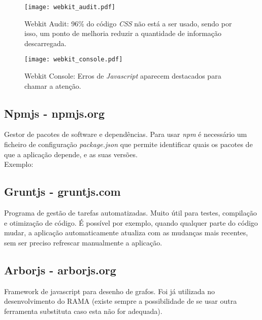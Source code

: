     \begin{figure}
      \begin{center}
        \texttt{[image: webkit\_audit.pdf]}
      \end{center}
      \caption{Webkit Audit: 96\% do código \emph{CSS} não está a ser usado, sendo por isso, um ponto de melhoria reduzir a quantidade de informação descarregada.}
      \label{fig:webkit_audit}
    \end{figure}

    \begin{figure}
      \begin{center}
        \texttt{[image: webkit\_console.pdf]}
      \end{center}
      \caption{Webkit Console: Erros de \emph{Javascript} aparecem destacados para chamar a atenção.}
      \label{fig:webkit_console}
    \end{figure}


  \subsection{Npmjs - npmjs.org} %
  \label{sub:npm}
    Gestor de pacotes de software e dependências.
    Para usar \emph{npm} é necessário um ficheiro de configuração \emph{package.json} que permite identificar quais os pacotes de que a aplicação depende, e as suas versões. \\
    Exemplo:

    


  \subsection{Gruntjs - gruntjs.com} %
    \label{sub:gruntjs} 
      Programa de gestão de tarefas automatizadas.
      Muito útil para testes, compilação e otimização de código.
      É possível por exemplo, quando qualquer parte do código mudar, a aplicação automaticamente atualiza com as mudanças mais recentes, sem ser preciso refrescar manualmente a aplicação.

  \subsection{Arborjs - arborjs.org} %
  \label{sub:arborjs}
    Framework de javascript para desenho de grafos. Foi já utilizada no desenvolvimento do RAMA (existe sempre a possibilidade de se usar outra ferramenta substituta caso esta não for adequada).
  
